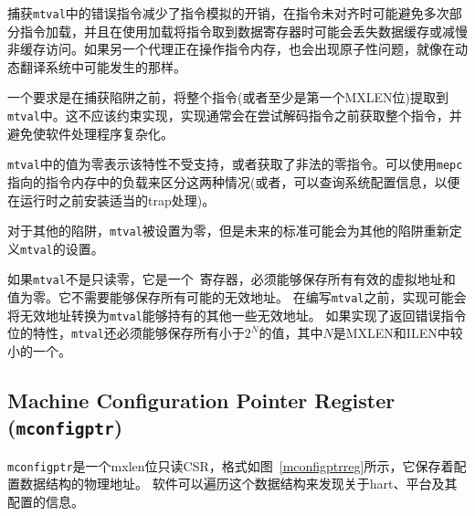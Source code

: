 {\begin{commentary}
捕获{\tt mtval}中的错误指令减少了指令模拟的开销，在指令未对齐时可能避免多次部分指令加载，并且在使用加载将指令取到数据寄存器时可能会丢失数据缓存或减慢非缓存访问。如果另一个代理正在操作指令内存，也会出现原子性问题，就像在动态翻译系统中可能发生的那样。

一个要求是在捕获陷阱之前，将整个指令(或者至少是第一个MXLEN位)提取到{\tt mtval}中。这不应该约束实现，实现通常会在尝试解码指令之前获取整个指令，并避免使软件处理程序复杂化。

{\tt mtval}中的值为零表示该特性不受支持，或者获取了非法的零指令。可以使用{\tt mepc}指向的指令内存中的负载来区分这两种情况(或者，可以查询系统配置信息，以便在运行时之前安装适当的trap处理)。
\end{commentary}

\iffalse
For other traps, {\tt mtval} is set to zero, but a future standard may
redefine {\tt mtval}'s setting for other traps.

If {\tt mtval} is not read-only zero, it is a \warl\ register that must be
able to hold all valid virtual addresses and the value zero.
It need not be capable of holding all
possible invalid addresses.
Prior to writing {\tt mtval}, implementations may convert an invalid address
into some other invalid address that {\tt mtval} is capable of holding.
If the feature to return the faulting instruction bits is implemented, {\tt
mtval} must also be able to hold all values less than $2^N$, where $N$ is the
smaller of MXLEN and ILEN.
\fi
对于其他的陷阱，{\tt mtval}被设置为零，但是未来的标准可能会为其他的陷阱重新定义{\tt mtval}的设置。

如果{\tt mtval}不是只读零，它是一个\warl\ 寄存器，必须能够保存所有有效的虚拟地址和值为零。它不需要能够保存所有可能的无效地址。
在编写{\tt mtval}之前，实现可能会将无效地址转换为{\tt mtval}能够持有的其他一些无效地址。
如果实现了返回错误指令位的特性，{\tt mtval}还必须能够保存所有小于$2^N$的值，其中$N$是MXLEN和ILEN中较小的一个。

\subsection{Machine Configuration Pointer Register ({\tt mconfigptr})}

\iffalse
{\tt mconfigptr} is an MXLEN-bit read-only CSR, formatted as shown in
Figure~\ref{mconfigptrreg}, that holds the physical address of a configuration
data structure.
Software can traverse this data structure to discover information about
the harts, the platform, and their configuration.
\fi
{\tt mconfigptr}是一个mxlen位只读CSR，格式如图~\ref{mconfigptrreg}所示，它保存着配置数据结构的物理地址。
软件可以遍历这个数据结构来发现关于hart、平台及其配置的信息。


}
